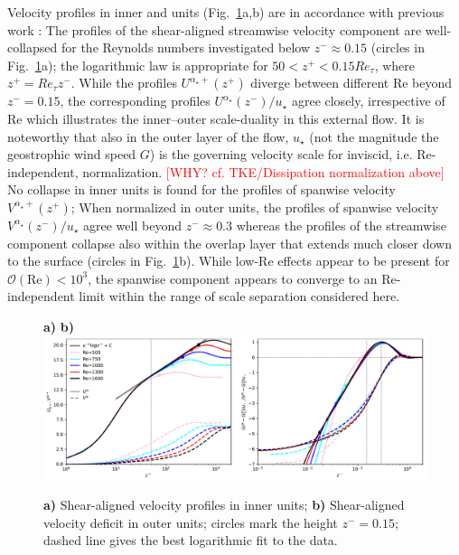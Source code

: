 \documentclass[a4paper,11pt]{amsart}
\newcommand{\todo}[1]{\textcolor{red}{$[$#1$]$}}
\newcommand{\RE}{\mathrm{Re}}
\begin{document}
%
\par
%
Velocity profiles in inner and units (Fig.~\ref{fig:profiles}a,b) are in accordance
with previous work \citep{coleman:JFM1992,spalart:PF2008,spalart:PF2009,ansorge:BM2014,ansorge:BM2019}:
%
The profiles of the shear-aligned streamwise velocity component are well-collapsed for the Reynolds
numbers investigated below $z^-\approx 0.15$ (circles in Fig.~\ref{fig:profiles}a); the logarithmic
law is appropriate for $50 < z^+ < 0.15 Re_\tau$, where $z^+ = Re_\tau z^-$.
%
While the profiles $U^{\alpha_\star+}(z^+)$ diverge between different $\RE$ beyond $z^-=0.15$,
the corresponding profiles $U^{\alpha_\star}(z^-)/u_\star$ agree closely,
irrespective of $\RE$ which illustrates the
inner--outer scale-duality in this external flow. 
%
It is noteworthy that also in the outer layer of the flow, $u_\star$ (not the magnitude the
geostrophic wind speed $G$) is the governing velocity scale for inviscid, i.e. $\RE$-independent,
normalization. \todo{WHY? cf. TKE/Dissipation normalization above}
%
No collapse in inner units is found for the profiles of spanwise velocity $V^{\alpha_\star+}(z^+)$;
%
When normalized in outer units, the profiles of spanwise velocity $V^{\alpha_\star}(z^-)/u_\star$
agree well beyond $z^-\approx 0.3$ whereas the profiles of the streamwise component collapse also
within the overlap layer that extends much closer down to the surface
(circles in Fig.~\ref{fig:profiles}b).
%
While low-$\RE$ effects appear to be present for $\mathcal{O}(\RE)<10^3$, the spanwise component
appears to converge to an $\RE$-independent limit within the range of scale separation considered
here.
%
\par
%
\begin{figure}
  \begin{flushleft}
    \textbf{a)}\hspace{0.47\textwidth} \textbf{b)}\\
    \includegraphics[width=\textwidth]{../plot/uv_innerouter.pdf}\\
    \caption{
      \textbf{a)} Shear-aligned velocity profiles in inner units;
      \textbf{b)} Shear-aligned velocity deficit in outer units; circles mark the
      height $z^-=0.15$; dashed line gives the best logarithmic fit to the data. 
      \label{fig:profiles}
    }
  \end{flushleft}
\end{figure}
\end{document}

